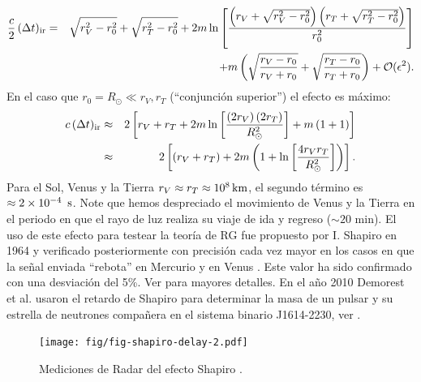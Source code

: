 \begin{eqnarray}
\frac{c}{2}\,(\Delta t)_{\rm ir}&=&\sqrt{r_V^2-r_0^2}+\sqrt{r_T^2-r_0^2}+2m\ln\left[\frac{\left(r_V+\sqrt{r_V^2-r_0^2}\right)\left(r_T+\sqrt{r_T^2-r_0^2}\right)}{r_0^2}\right] \nonumber\\
&&+m\left(\sqrt{\frac{r_V-r_0}{r_V+r_0}}+\sqrt{\frac{r_T-r_0}{r_T+r_0}}\right)+\mathcal{O}(\epsilon^2).
\end{eqnarray}
En el caso que $r_0=R_\odot\ll r_V, r_T$ (``conjunción superior'') el efecto es máximo:
\begin{eqnarray}
c\,(\Delta t)_{\rm ir}&\approx& 2\left[r_V+r_T+2m\ln\left[\frac{\left(2r_V\right)\left(2r_T\right)}{R_\odot^2}\right]+m\left(1+1\right) \right]\\
&\approx&2\left[(r_V+r_T)+2m\left(1+\ln\left[\frac{4r_Vr_T}{R_\odot^2}\right]\right)\right].
\end{eqnarray}
Para el Sol, Venus y la Tierra $r_V\approx r_T\approx 10^8\text{\,km}$, el segundo término es $\approx 2\times 10^{-4}\text{\, s}$. Note que hemos despreciado el movimiento de Venus y la Tierra en el periodo en que el rayo de luz realiza su viaje de ida y regreso ($\sim 20\text{ min}$). El uso de este efecto para testear la teoría de RG fue propuesto por I. Shapiro en 1964 \cite{Shapiro64} y verificado posteriormente con precisión cada vez mayor en los casos en que la señal enviada ``rebota'' en Mercurio y en Venus \cite{Shapiro71}. Este valor ha sido confirmado con una desviación del 5\%. Ver \cite{Wei72} para mayores detalles. En el año 2010 Demorest et al. usaron el retardo de Shapiro para determinar la masa de un pulsar y su estrella de neutrones compañera en el sistema binario J1614-2230, ver \cite{Demorest}.
\begin{figure}[H]
\begin{center}
\texttt{[image: fig/fig-shapiro-delay-2.pdf]}
\caption{Mediciones de Radar del efecto Shapiro \cite{Shapiro71}.}
\end{center}
\end{figure}
